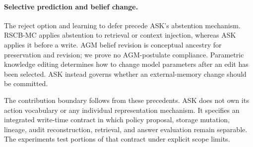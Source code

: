 \paragraph{Selective prediction and belief change.}
The reject option \citep{chow1970reject,elyaniv2010selective,
geifman2017selective} and learning to defer \citep{madras2018defer,
mozannar2020defer} precede ASK's abstention mechanism. RSCB-MC
\citep{iscan2026rscbmc} applies abstention to retrieval or context injection,
whereas ASK applies it before a write. AGM belief revision
\citep{alchourron1985agm} is conceptual ancestry for preservation and revision;
we prove no AGM-postulate compliance. Parametric knowledge editing
\citep{meng2022rome,meng2023memit} determines how to change model parameters
after an edit has been selected. ASK instead governs whether an external-memory
change should be committed.

The contribution boundary follows from these precedents. ASK does not own its
action vocabulary or any individual representation mechanism. It specifies an
integrated write-time contract in which policy proposal, storage mutation,
lineage, audit reconstruction, retrieval, and answer evaluation remain
separable. The experiments test portions of that contract under explicit scope
limits.
